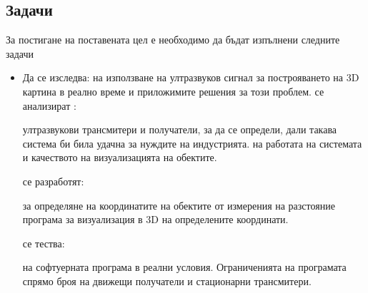 \subsection{Задачи}
За постигане на поставената цел е необходимо да бъдат изпълнени следните задачи
\begin{itemize}
    \item Да се изследва:
     на използване на ултразвуков сигнал за построяването на 3D картина в реално време и приложимите решения за този проблем.
     се анализират :
    \begin{enumerate}
      ултразвукови трансмитери и получатели, за да се определи, дали такава система би била удачна за нуждите на индустрията.
      на работата на системата и качеството на визуализацията на обектите.
    \end{enumerate}
     се разработят:
    \begin{enumerate}
     за определяне на координатите на обектите от измерения на разстояние
     програма за визуализация в 3D на определените координати.
    \end{enumerate}
     се тества:
    \begin{enumerate}
     на софтуерната програма в реални условия.
    Ограниченията на програмата спрямо броя на движещи получатели и стационарни трансмитери.
    \end{enumerate}
\end{itemize}